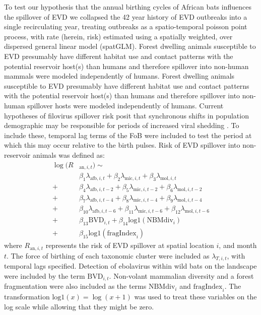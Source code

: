 \documentclass[9pt,twoside,lineno]{pnas-new}
\newcommand{\afb}{\mathrm{afb}}
\newcommand{\mic}{\mathrm{mic}}
\newcommand{\mol}{\mathrm{mol}}
\newcommand{\logplus}{\mathrm{log1}}
\begin{document}
To test our hypothesis that the annual birthing cycles of African bats influences the spillover of EVD we collapsed the 42 year history of EVD outbreaks into a single recirculating year, treating outbreaks as a spatio-temporal poisson point process, with rate (herein, risk) estimated using a spatially weighted, over dispersed general linear model (spatGLM). Forest dwelling animals susceptible to EVD presumably have different habitat use and contact patterns with the potential reservoir host(s) than humans and therefore spillover into non-human mammals were modeled independently of humans. Forest dwelling animals susceptible to EVD presumably have different habitat use and contact patterns with the potential reservoir host(s) than humans and therefore spillover into non-human spillover hosts were modeled independently of humans. Current hypotheses of filovirus spillover risk posit that synchronous shifts in population demographic may be responsible for periods of increased viral shedding \cite{Hayman2015BiannualPopulations, Pourrut2009LargeAegyptiacus.}. To include these, temporal lag terms of the FoB were included to test the period at which this may occur relative to the birth pulses. Risk of EVD spillover into non-reservoir animals was defined as:
\[
\begin{split}
    \log(R& _{\mathrm{an}, i, t}) \sim \\
    & \beta_1 \lambda_{\afb, i, t} + \beta_2 \lambda_{\mic, i, t} + \beta_3 \lambda_{\mol, i, t} \\
 + &\beta_4 \lambda_{\afb, i, t-2} + \beta_5 \lambda_{\mic, i, t-2} + \beta_6 \lambda_{\mol, i, t-2} \\
 + &\beta_7 \lambda_{\afb, i, t-4} + \beta_8 \lambda_{\mic, i, t-4} + \beta_9 \lambda_{\mol, i, t-4} \\
 + &\beta_{10} \lambda_{\afb, i, t-6} + \beta_{11} \lambda_{\mic, i, t-6} + \beta_{12} \lambda_{\mol, i, t-6} \\
 +&\beta_{13} \mathrm{BVD}_{i,t} +  \beta_{14} \logplus(\mathrm{NBM div}_{i})\\
 + &\beta_{15} \logplus(\mathrm{fragIndex}_{i}) 
\end{split}
\]
where $R_{\mathrm{an}, i, t}$ represents the risk of EVD spillover at spatial location $i$, and month $t$. The force of birthing of each taxonomic cluster were included as $\lambda_{T, i, t}$, with temporal lags specified. Detection of ebolavirus within wild bats on the landscape were included by the term $\mathrm{BVD}_{i,t}$. Non-volant mammalian diversity and a forest fragmentation were also included as the terms $\mathrm{NBM div}_{i}$ and $\mathrm{fragIndex}_{i}$. The transformation $\logplus(x) = \log(x + 1)$ was used to treat these variables on the log scale while allowing that they might be zero.
\end{document}
